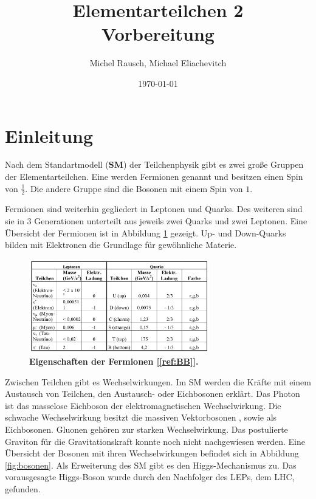 \documentclass[a4paper,ngerman]{scrartcl}
\title{Elementarteilchen 2\\Vorbereitung}
\date{\today}
\author{Michel Rausch, Michael Eliachevitch}
\begin{document}
\maketitle
\tableofcontents
\newpage

\section{Einleitung}

Nach dem Standartmodell (\textbf{SM}) der Teilchenphysik gibt es zwei große Gruppen der Elementarteilchen.
Eine werden Fermionen genannt und besitzen einen Spin von $\frac{1}{2}$. 
Die andere Gruppe sind die Bosonen mit einem Spin von $1$.

Fermionen sind weiterhin gegliedert in Leptonen und Quarks.
Des weiteren sind sie in 3 Generationen unterteilt aus jeweils zwei Quarks und zwei Leptonen. 
Eine Übersicht der Fermionen ist in Abbildung \ref{fig:fermionen} gezeigt.
Up- und Down-Quarks bilden mit Elektronen die Grundlage für gewöhnliche Materie.
\begin{figure}[tbh!]
\centering
\includegraphics[width=0.7\textwidth]{abbildungen/fermionen.png}
\caption{\textbf{Eigenschaften der Fermionen [\ref{ref:BB}].} 
}
\label{fig:fermionen}
\end{figure}

Zwischen Teilchen gibt es Wechselwirkungen.
Im SM werden die Kräfte mit einem Austausch von Teilchen, den Austausch- oder Eichbosonen erklärt.
Das Photon ist das masselose Eichboson der elektromagnetischen Wechselwirkung.
Die schwache Wechselwirkung besitzt die massiven Vektorbosonen \PWpm , sowie \PZzero als Eichbosonen.
Gluonen gehören zur starken Wechselwirkung.
Das postulierte Graviton für die Gravitationskraft konnte noch nicht nachgewiesen werden.
Eine Übersicht der Bosonen mit ihren Wechselwirkungen befindet sich in Abbildung \ref{fig:bosonen}.
Als Erweiterung des SM gibt es den Higgs-Mechanismus zu.
Das vorausgesagte Higgs-Boson wurde durch den Nachfolger des LEPs, dem LHC, gefunden.
\end{document}
